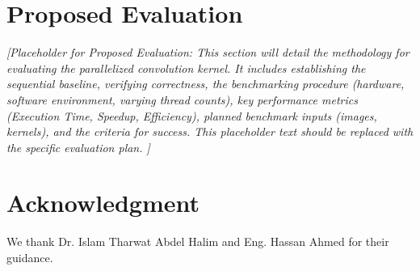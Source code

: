 \documentclass[conference, 10pt]{IEEEtran}
\begin{document}
\section{Proposed Evaluation}
\textit{{\color{blue} %
[Placeholder for Proposed Evaluation: This section will detail the methodology for evaluating the parallelized convolution kernel. It includes establishing the sequential baseline, verifying correctness, the benchmarking procedure (hardware, software environment, varying thread counts), key performance metrics (Execution Time, Speedup, Efficiency), planned benchmark inputs (images, kernels), and the criteria for success. This placeholder text should be replaced with the specific evaluation plan.
\cite{hbdscientific2025}]
}}







\section*{Acknowledgment} 
We thank Dr. Islam Tharwat Abdel Halim and Eng. Hassan Ahmed for their guidance.


 
\end{document}
